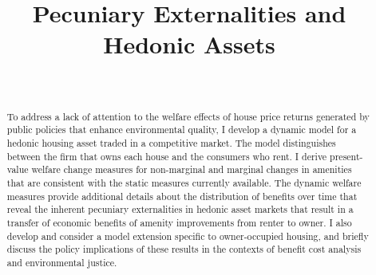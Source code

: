 \documentclass[ecta,nameyear,draft]{econsocart}
\theoremstyle{plain}
\theoremstyle{remark}
\begin{document}
\begin{frontmatter}

\title{Pecuniary Externalities and Hedonic Assets}

\begin{aug}
%
%
%
\author[id=au1,addressref={add1}]{~}
\address[id=add1]{%
,
}


\end{aug}

%
\begin{abstract}
To address a lack of attention to the welfare effects of house price returns generated by public policies that enhance environmental quality, I develop a dynamic model for a hedonic housing asset traded in a competitive market. The model distinguishes between the firm that owns each house and the consumers who rent. I derive present-value welfare change measures for non-marginal and marginal changes in amenities that are consistent with the static measures currently available. The dynamic welfare measures provide additional details about the distribution of benefits over time that reveal the inherent pecuniary externalities in hedonic asset markets that result in a transfer of economic benefits of amenity improvements from renter to owner. I also develop and consider a model extension specific to owner-occupied housing, and briefly discuss the policy implications of these results in the contexts of benefit cost analysis and environmental justice.
\end{abstract}

\begin{keyword}
\end{keyword}

\end{frontmatter}
\end{document}
